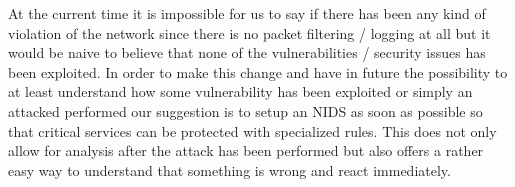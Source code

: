 \documentclass[paper=a4]{../../_global/texMemo}
\begin{document}
At the current time it is impossible for us to say if there has been any kind of violation of the network since there is no packet filtering / logging at all but it would be naive to believe that none of the vulnerabilities / security issues has been exploited. In order to make this change and have in future the possibility to at least understand how some vulnerability has been exploited or simply an attacked performed our suggestion is to setup an NIDS as soon as possible so that critical services can be protected with specialized rules.
This does not only allow for analysis after the attack has been performed but also offers a rather easy way to understand that something is wrong and react immediately.
\end{document}
